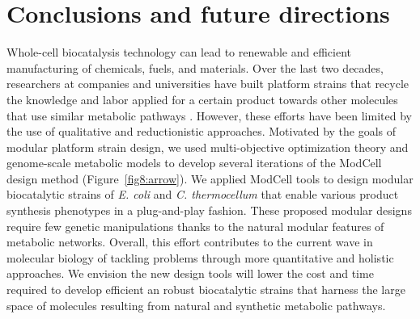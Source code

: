 
\renewcommand{\thefigure}{\roman{figure}} %
\setcounter{figure}{0}

\chapter*{Conclusions and future directions}\label{ch:conclusion}





Whole-cell biocatalysis technology can lead to renewable and efficient manufacturing of chemicals, fuels, and materials.
Over the last two decades, researchers at companies and universities have built platform strains that recycle the knowledge and labor applied for a certain product towards other molecules that use similar metabolic pathways \citep{nielsen2016}.
However, these efforts have been limited by the use of qualitative and reductionistic approaches.
Motivated by the goals of modular platform strain design, we used multi-objective optimization theory and  genome-scale metabolic models to develop several iterations of the ModCell design method (Figure~\ref{fig8:arrow}).
We applied ModCell tools to design modular biocatalytic strains of \textit{E. coli} and \textit{C. thermocellum} that enable various product synthesis phenotypes in a plug-and-play fashion.
These proposed modular designs require few genetic manipulations thanks to the natural modular features of metabolic networks.
Overall, this effort contributes to the current wave in molecular biology of tackling problems through more quantitative and holistic approaches.
We envision the new design tools will lower the cost and time required to develop efficient an robust biocatalytic strains that harness the large space of molecules resulting from natural and synthetic metabolic pathways.

